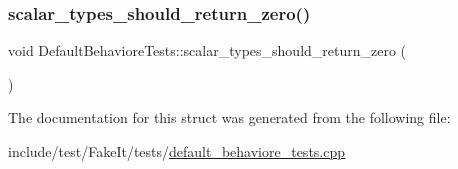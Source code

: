 \subsubsection{\texorpdfstring{scalar\_types\_should\_return\_zero()}{scalar\_types\_should\_return\_zero()}}
{\footnotesize\ttfamily void Default\+Behaviore\+Tests\+::scalar\+\_\+types\+\_\+should\+\_\+return\+\_\+zero (\begin{DoxyParamCaption}{ }\end{DoxyParamCaption})\hspace{0.3cm}{\ttfamily [inline]}}



The documentation for this struct was generated from the following file\+:\begin{DoxyCompactItemize}
\item 
include/test/\+Fake\+It/tests/\mbox{\hyperlink{default__behaviore__tests_8cpp}{default\+\_\+behaviore\+\_\+tests.\+cpp}}\end{DoxyCompactItemize}
